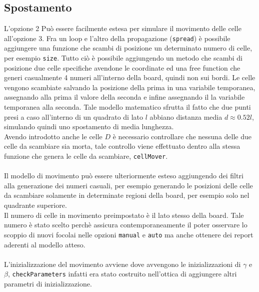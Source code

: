 \documentclass[a4paper]{article}
\begin{document}
\subsection{Spostamento}
L'opzione 2 Può essere facilmente estesa per simulare il movimento delle celle all'opzione 3. Fra un loop e l'altro della propagazione (\texttt{spread}) è possibile aggiungere una funzione che scambi di posizione un determinato numero di celle, per esempio \texttt{size}. Tutto ciò è possibile aggiungendo un metodo che scambi di posizione due celle specifiche avendone le coordinate ed una free function che generi casualmente 4 numeri all'interno della board, quindi non sui bordi. Le celle vengono scambiate salvando la posizione della prima in una variabile temporanea, assegnando alla prima il valore della seconda e infine assegnando il la variabile temporanea alla seconda. Tale modello matematico sfrutta il fatto che due punti presi a caso all'interno di un quadrato di lato $l$ abbiano distanza media $d \approx 0.52l$, simulando quindi uno spostamento di media lunghezza.\\
Avendo introdotto anche le celle $D$ è necessario controllare che nessuna delle due celle da scambiare sia morta, tale controllo viene effettuato dentro alla stessa funzione che genera le celle da scambiare, \texttt{cellMover}.\\ \\
Il modello di movimento può essere ulteriormente esteso aggiungendo dei filtri alla generazione dei numeri casuali, per esempio generando le posizioni delle celle da scambiare solamente in determinate regioni della board, per esempio solo nel quadrante superiore.\\
Il numero di celle in movimento preimpostato è il lato stesso della board. Tale numero è stato scelto perchè assicura contemporaneamente il poter osservare lo scoppio di nuovi focolai nelle opzioni \texttt{manual} e \texttt{auto} ma anche ottenere dei report aderenti al modello atteso. \\ \\
L'inizializzazione del movimento avviene dove avvengono le inizializzazioni di $\gamma$ e $\beta$, \texttt{checkParameters} infatti era stato costruito nell'ottica di aggiungere altri parametri di inizializzazione.\\
\end{document}
